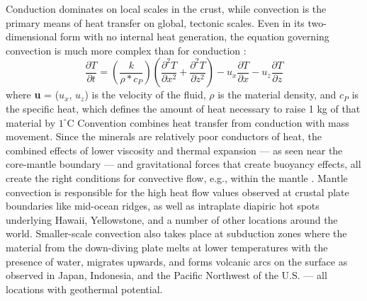 Conduction dominates on local scales in the crust, while convection is the primary means of heat transfer on global, tectonic scales. Even in its two-dimensional form with no internal heat generation, the equation governing convection is much more complex than for conduction \citep[~p. 355]{lowrie_fundamentals_2007}:
\begin{equation}\label{eq:convection}
\frac{\partial T}{\partial t} = \left (\frac{k}{\rho * c_P}\right)\left (\frac{\partial ^2T}{\partial x^2}+\frac{\partial ^2T}{\partial z^2}\right)-u_x\frac{\partial T}{\partial x}-u_z\frac{\partial T}{\partial z}
\end{equation}
where \textbf{u} = ($u_x$, $u_z$) is the velocity of the fluid, $\rho$ is the material density, and $c_P$ is the specific heat, which defines the amount of heat necessary to raise 1 kg of that material by $1^\circ$C Convention combines heat transfer from conduction with mass movement. Since the minerals are relatively poor conductors of heat, the combined effects of lower viscosity and thermal expansion --– as seen near the core-mantle boundary –-- and gravitational forces that create buoyancy effects, all create the right conditions for convective flow, e.g., within the mantle \citep[~p. 25]{glassley_geothermal_2015}. Mantle convection is responsible for the high heat flow values observed at crustal plate boundaries like mid-ocean ridges, as well as intraplate diapiric hot spots underlying Hawaii, Yellowstone, and a number of other locations around the world. Smaller-scale convection also takes place at subduction zones where the material from the down-diving plate melts at lower temperatures with the presence of water, migrates upwards, and forms volcanic arcs on the surface as observed in Japan, Indonesia, and the Pacific Northwest of the U.S. \citep[~p. 31-33]{press_understanding_2004} --– all locations with geothermal potential.

